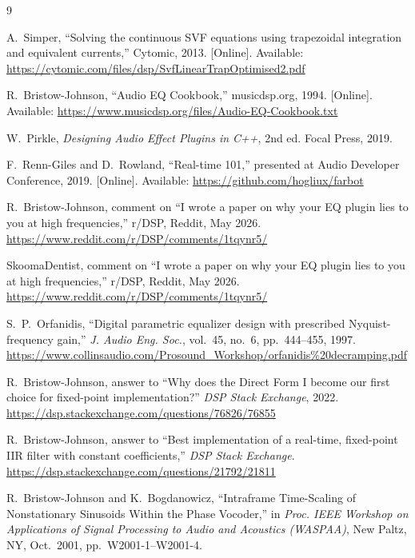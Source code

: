 \documentclass[twoside,a4paper]{article}
\begin{document}

\begin{thebibliography}{9}

A.~Simper, ``Solving the continuous SVF equations using trapezoidal integration and equivalent currents,'' Cytomic, 2013. [Online]. Available: \url{https://cytomic.com/files/dsp/SvfLinearTrapOptimised2.pdf}

R.~Bristow-Johnson, ``Audio EQ Cookbook,'' musicdsp.org, 1994. [Online]. Available: \url{https://www.musicdsp.org/files/Audio-EQ-Cookbook.txt}

W.~Pirkle, \textit{Designing Audio Effect Plugins in C++}, 2nd ed. Focal Press, 2019.

F.~Renn-Giles and D.~Rowland, ``Real-time 101,'' presented at Audio Developer Conference, 2019. [Online]. Available: \url{https://github.com/hogliux/farbot}


R.~Bristow-Johnson, comment on ``I wrote a paper on why your EQ plugin lies to you at high frequencies,'' r/DSP, Reddit, May 2026.
\url{https://www.reddit.com/r/DSP/comments/1tqynr5/}

SkoomaDentist, comment on ``I wrote a paper on why your EQ plugin lies to you at high frequencies,'' r/DSP, Reddit, May 2026.
\url{https://www.reddit.com/r/DSP/comments/1tqynr5/}

S.~P.~Orfanidis, ``Digital parametric equalizer design with prescribed Nyquist-frequency gain,''
\textit{J. Audio Eng. Soc.}, vol.~45, no.~6, pp.~444--455, 1997.
\url{https://www.collinsaudio.com/Prosound_Workshop/orfanidis\%20decramping.pdf}

R.~Bristow-Johnson, answer to ``Why does the Direct Form I become our first choice for fixed-point implementation?''
\textit{DSP Stack Exchange}, 2022.
\url{https://dsp.stackexchange.com/questions/76826/76855}

R.~Bristow-Johnson, answer to ``Best implementation of a real-time, fixed-point IIR filter with constant coefficients,''
\textit{DSP Stack Exchange}.
\url{https://dsp.stackexchange.com/questions/21792/21811}

R.~Bristow-Johnson and K.~Bogdanowicz, ``Intraframe Time-Scaling of Nonstationary Sinusoids Within the Phase Vocoder,''
in \textit{Proc. IEEE Workshop on Applications of Signal Processing to Audio and Acoustics (WASPAA)},
New Paltz, NY, Oct.\ 2001, pp.~W2001-1--W2001-4.


\end{thebibliography}
\end{document}
